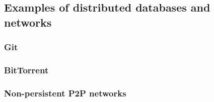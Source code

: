 \subsection{Examples of distributed databases and networks}


\subsubsection{Git}


\subsubsection{BitTorrent}


\subsubsection{Non-persistent P2P networks}

